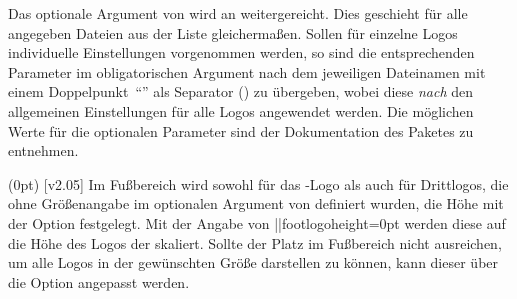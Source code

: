 \begin{DeclareEntity*}{}
\begin{DeclareEntity*}{}
\begin{DeclareEntity*}{}
\begin{Declaration}
\begin{Declaration}
Das optionale Argument von  wird an  
weitergereicht. Dies geschieht für alle angegeben Dateien aus der Liste 
gleichermaßen. Sollen für einzelne Logos individuelle Einstellungen vorgenommen 
werden, so sind die entsprechenden Parameter im obligatorischen Argument nach 
dem jeweiligen Dateinamen mit einem Doppelpunkt~\enquote{\PValue{:}} als 
Separator () zu 
übergeben, wobei diese \emph{nach} den allgemeinen Einstellungen für alle Logos 
angewendet werden. Die möglichen Werte für die optionalen Parameter sind der 
Dokumentation des Paketes  zu entnehmen.
\end{Declaration}
\end{Declaration}

\begin{Declaration}
  {}
  (0pt)
  [v2.05]
\printdeclarationlist
%
Im Fußbereich wird sowohl für das \DDC-Logo als auch für Drittlogos, die ohne 
Größenangabe im optionalen Argument von  definiert wurden, die 
Höhe mit der Option  festgelegt. Mit der Angabe 
von \Option||{footlogoheight=0pt} werden diese auf die Höhe des Logos der 
\TnUD skaliert. Sollte der Platz im Fußbereich nicht ausreichen, um alle Logos 
in der gewünschten Größe darstellen zu können, kann dieser über die Option
 angepasst werden.
\end{Declaration}


\end{DeclareEntity*}
\end{DeclareEntity*}
\end{DeclareEntity*}
